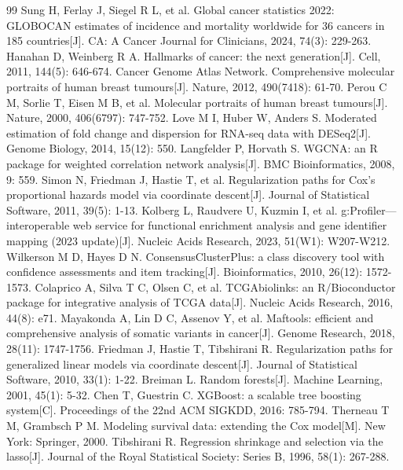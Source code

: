 \documentclass[12pt,a4paper]{article}
\begin{document}
\begin{thebibliography}{99}
 Sung H, Ferlay J, Siegel R L, et al. Global cancer statistics 2022: GLOBOCAN estimates of incidence and mortality worldwide for 36 cancers in 185 countries[J]. CA: A Cancer Journal for Clinicians, 2024, 74(3): 229-263.
 Hanahan D, Weinberg R A. Hallmarks of cancer: the next generation[J]. Cell, 2011, 144(5): 646-674.
 Cancer Genome Atlas Network. Comprehensive molecular portraits of human breast tumours[J]. Nature, 2012, 490(7418): 61-70.
 Perou C M, Sorlie T, Eisen M B, et al. Molecular portraits of human breast tumours[J]. Nature, 2000, 406(6797): 747-752.
 Love M I, Huber W, Anders S. Moderated estimation of fold change and dispersion for RNA-seq data with DESeq2[J]. Genome Biology, 2014, 15(12): 550.
 Langfelder P, Horvath S. WGCNA: an R package for weighted correlation network analysis[J]. BMC Bioinformatics, 2008, 9: 559.
 Simon N, Friedman J, Hastie T, et al. Regularization paths for Cox's proportional hazards model via coordinate descent[J]. Journal of Statistical Software, 2011, 39(5): 1-13.
 Kolberg L, Raudvere U, Kuzmin I, et al. g:Profiler---interoperable web service for functional enrichment analysis and gene identifier mapping (2023 update)[J]. Nucleic Acids Research, 2023, 51(W1): W207-W212.
 Wilkerson M D, Hayes D N. ConsensusClusterPlus: a class discovery tool with confidence assessments and item tracking[J]. Bioinformatics, 2010, 26(12): 1572-1573.
 Colaprico A, Silva T C, Olsen C, et al. TCGAbiolinks: an R/Bioconductor package for integrative analysis of TCGA data[J]. Nucleic Acids Research, 2016, 44(8): e71.
 Mayakonda A, Lin D C, Assenov Y, et al. Maftools: efficient and comprehensive analysis of somatic variants in cancer[J]. Genome Research, 2018, 28(11): 1747-1756.
 Friedman J, Hastie T, Tibshirani R. Regularization paths for generalized linear models via coordinate descent[J]. Journal of Statistical Software, 2010, 33(1): 1-22.
 Breiman L. Random forests[J]. Machine Learning, 2001, 45(1): 5-32.
 Chen T, Guestrin C. XGBoost: a scalable tree boosting system[C]. Proceedings of the 22nd ACM SIGKDD, 2016: 785-794.
 Therneau T M, Grambsch P M. Modeling survival data: extending the Cox model[M]. New York: Springer, 2000.
 Tibshirani R. Regression shrinkage and selection via the lasso[J]. Journal of the Royal Statistical Society: Series B, 1996, 58(1): 267-288.
\end{thebibliography}
\end{document}
